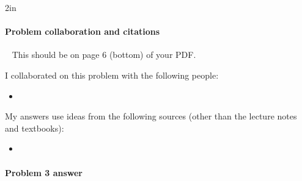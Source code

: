 
\begin{answerBox}{2in}          %

  
  \paragraph{Problem  collaboration and citations}~\GradescopeComment
  {This should be on page 6 (bottom) of your PDF.}

  I collaborated on this problem with the following people:
  \begin{blue}
    \begin{itemize}

    \item \REPLACEME            %

    \end{itemize}
  \end{blue}

  My answers use ideas from the following sources (other than the lecture notes and textbooks): 
  \begin{blue}
    \begin{itemize}

    \item \REPLACEME            %

    \end{itemize}
  \end{blue}

\end{answerBox}

\newpage

\paragraph{Problem 3 answer}

